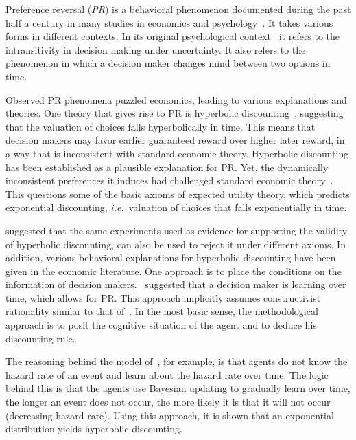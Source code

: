 \documentclass[11pt]{article}
\newcommand{\ie}{{\it i.e.}\ }
\numberwithin{equation}{section}
\begin{document}
Preference reversal (\textit{PR}) is a behavioral phenomenon documented during the past half a century in many studies in economics and psychology~\citep{lichtenstein1971reversals,lindman1971inconsistent,grether1979economic,loomes1983rationale,tversky1990causes,ainslie1992picoeconomics,laibson1997golden}. It takes various forms in different contexts. In its original psychological context~\citep{tversky1969intransitivity,lichtenstein1971reversals} it refers to the intransitivity in decision making under uncertainty. It also refers to the phenomenon in which a decision maker changes mind between two options in time.

Observed PR phenomena puzzled economics, leading to various explanations and theories. One theory that gives rise to PR is hyperbolic discounting~\citep{ainslie1992picoeconomics,sozou1998hyperbolic,laibson1997golden}, suggesting that the valuation of choices falls hyperbolically in time. This means that decision makers may favor earlier guaranteed reward over higher later reward, in a way that is inconsistent with standard economic theory. Hyperbolic discounting has been established as a plausible explanation for PR. 
Yet, the dynamically inconsistent preferences it induces had challenged standard economic theory~\citep{laibson1997golden,starmer2000developments,thaler2016behavioral}. This questions some of the basic axioms of expected utility theory, which predicts exponential discounting, \ie valuation of choices that falls exponentially in time.

\citet{rubinstein2003economics} suggested that the same experiments used as evidence for supporting the validity of hyperbolic discounting, can also be used to reject it under different axioms. In addition, various behavioral explanations for hyperbolic discounting have been given in the economic literature. One approach is to place the conditions on the information of decision makers.~\citet{sozou1998hyperbolic,dasgupta2005uncertainty} suggested that a decision maker is learning over time, which allows for PR. This approach implicitly assumes constructivist rationality similar to that of~\citet{smith2003constructivist}. In the most basic sense, the methodological approach is to posit the cognitive situation of the agent and to deduce his discounting rule.

The reasoning behind the model of~\citet{sozou1998hyperbolic}, for example, is that agents do not know the hazard rate of an event and learn about the hazard rate over time. The logic behind this is that the agents use Bayesian updating to gradually learn over time, the longer an event does not occur, the more likely it is that it will not occur (decreasing hazard rate). Using this approach, it is shown that an exponential distribution yields hyperbolic discounting.
\end{document}
